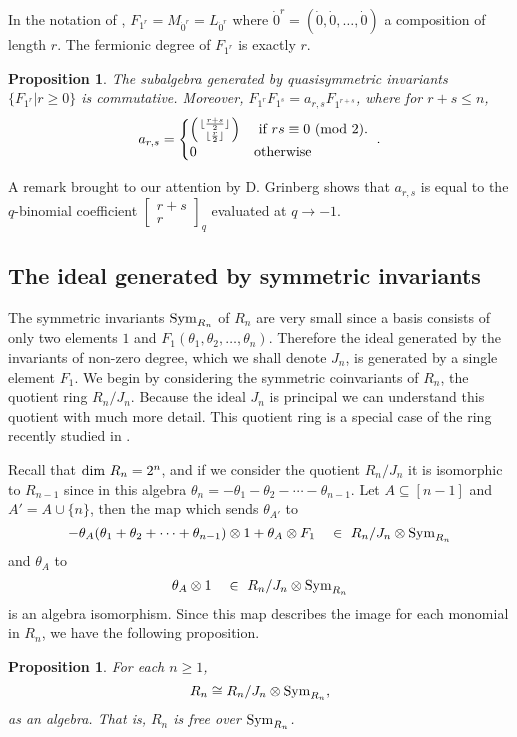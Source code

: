 \documentclass[submission]{FPSAC2023}
\newtheorem{prop}[theorem]{Proposition}
\theoremstyle{definition}
\numberwithin{equation}{section}
\newcommand{\qbinom}[2]{\left[ \begin{smallmatrix}#1\\#2\end{smallmatrix} \right]}
\begin{document}
In the notation of \cite{FLP}, $F_{1^r}=M_{\dot{0}^r}=L_{\dot{0}^r}$ where $\dot{0}^r=(\dot{0},\dot{0},\ldots,\dot{0})$ a composition of length $r$. The fermionic degree of $F_{1^r}$ is exactly $r$.

\begin{prop} \label{prop:comm}
The subalgebra generated by quasisymmetric invariants $\{F_{1^r}|r\ge 0\}$ is commutative.
Moreover,
$F_{1^r} F_{1^s} = a_{r,s} F_{1^{r+s}}$, where for $r+s \leq n$,
\[a_{r,s} = \begin{cases}
	\left({\lfloor \frac{r+s}{2} \rfloor \atop \lfloor \frac{r}{2} \rfloor}\right)&\hbox{ if }rs \equiv 0~({\rm mod}~2).\\
	0&\hbox{otherwise}
\end{cases}~.
\]
\end{prop}
A remark brought to our attention by D. Grinberg \cite{DG} shows that
$a_{r,s}$ is equal to the $q$-binomial coefficient $\qbinom{r+s}{r}_q$ evaluated at $q \rightarrow -1$.

\subsection{The ideal generated by symmetric invariants}
The symmetric invariants ${\rm Sym}_{R_n}$ of $R_n$ are very small since a basis consists of only two
elements $1$ and $F_1(\theta_1, \theta_2, \ldots, \theta_n)$.  Therefore the ideal generated by the invariants of non-zero
degree, which we shall denote $J_n$, is generated by a single element
$F_1$.
We begin by considering the symmetric
coinvariants of $R_n$, the quotient ring $R_n/J_n$.
Because the ideal $J_n$ is principal we can
understand this quotient with much more detail.
This quotient ring is a special case of the ring
recently studied in \cite{IRR,KR}.

Recall that ${\rm dim}~R_n = 2^n$,
and if we consider the quotient $R_n/J_n$ it is isomorphic to $R_{n-1}$ since
in this algebra $\theta_n = - \theta_1 -\theta_2 - \cdots - \theta_{n-1}$.
Let $A \subseteq [n-1]$ and $A' = A \cup \{n\}$, then
the map which sends
$\theta_{A'}$ to
$$-\theta_{A}(\theta_1 + \theta_2 + \cdots + \theta_{n-1}) \otimes 1
+ \theta_{A} \otimes F_1\quad \in\ R_n/J_n \otimes {\rm Sym}_{R_n}$$
and $\theta_{A}$ to
$$\theta_{A} \otimes 1 \quad \in \ R_n/J_n \otimes {\rm Sym}_{R_n}$$
is an algebra isomorphism.  Since this map describes the image
for each monomial in $R_n$, we have the following proposition.

\begin{prop} \label{prop:free}
For each $n \geq 1$,
$$R_n \cong R_n/J_n \otimes {\rm Sym}_{R_n},$$
as an algebra.  That is, $R_n$ is free over ${\rm Sym}_{R_n}$.
\end{prop}
\end{document}
